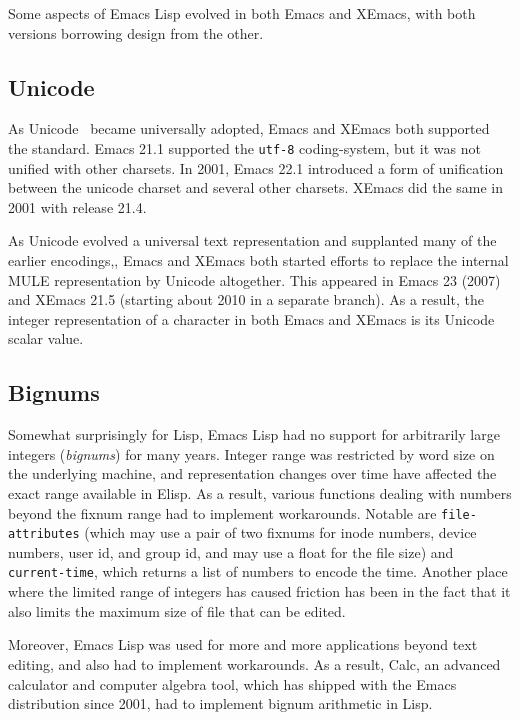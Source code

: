 \documentclass[format=acmsmall, review=false, screen=true]{acmart}
\newcommand \Elisp {Elisp}
\begin{document}
Some aspects of Emacs Lisp evolved in both Emacs and XEmacs, with both
versions borrowing design from the other.

\subsection{Unicode}

As Unicode~\cite{Unicode6} became universally adopted, Emacs and
XEmacs both supported the standard.  Emacs 21.1 supported the
\texttt{utf-8} coding-system, but it was not unified with other
charsets.  In 2001, Emacs 22.1 introduced a form of unification
between the unicode charset and several other charsets.  XEmacs did
the same in 2001 with release 21.4.

As Unicode evolved a universal text representation and supplanted many
of the earlier encodings,, Emacs and XEmacs both started efforts to
replace the internal MULE representation by Unicode altogether.  This
appeared in Emacs 23 (2007) and XEmacs 21.5 (starting about 2010 in a
separate branch).  As a result, the integer representation of a
character in both Emacs and XEmacs is its Unicode scalar value.

\subsection{Bignums}

Somewhat surprisingly for Lisp, Emacs Lisp had no support for
arbitrarily large integers (\emph{bignums}) for many years.
Integer range was restricted by word size on the underlying machine,
and representation changes over time have affected the exact range
available in \Elisp.
As a result, various functions dealing with numbers beyond the fixnum range
had to implement workarounds.  Notable are \texttt{file-attributes} (which
may use a pair of two fixnums for inode numbers, device numbers, user id,
and group id, and may use a float for the file size) and
\texttt{current-time}, which returns a list of numbers to encode the time.
Another place where the limited range of integers has caused friction has
been in the fact that it also limits the maximum size of file that can
be edited.

Moreover, Emacs Lisp was used for more and more applications beyond
text editing, and also had to implement workarounds.  As a result,
Calc, an advanced calculator and computer algebra tool, which has
shipped with the Emacs distribution since 2001, had to implement
bignum arithmetic in Lisp.
\end{document}
